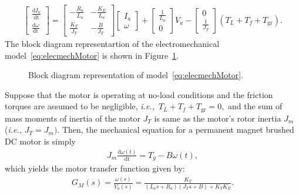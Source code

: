 %
  \begin{align}
    \label{eq:elecmechMotor}
  \begin{bmatrix}
    \frac{\mathrm{d}I_a}{\mathrm{dt}}\\
    \frac{\mathrm{d}\omega}{\mathrm{dt}}
  \end{bmatrix}
  = 
  \begin{bmatrix}
    -\frac{R_a}{L_a}  & -\frac{K_E}{L_a}\\
    \frac{K_T}{J_T}  & -\frac{B}{J_T}
  \end{bmatrix}
  \begin{bmatrix}
    I_a\\
    \omega
  \end{bmatrix}
+
  \begin{bmatrix}
    \frac{1}{L_a}\\
    0
  \end{bmatrix}
  V_a
-
  \begin{bmatrix}
    0\\
    \frac{1}{J_T}
  \end{bmatrix}
(T_L+T_f+T_{\mathrm{gr}}).
\end{align}
%
The block diagram representartion of the electromechanical model~\eqref{eq:elecmechMotor} is shown in Figure~\ref{fig:dcMotorElecMech}. %
%
\begin{figure}
  \centering
\caption{Block diagram representation of model~\eqref{eq:elecmechMotor}.}
\label{fig:dcMotorElecMech}
\end{figure}
%
Suppose that the motor is operating at no-load conditions and the friction torques are assumed to be negligible, \textit{i.e.,~}$T_L + T_f +T_{\mathrm{gr}} = 0,$ and the sum of mass moments of inertia of the motor $J_T$ is same as the motor's rotor inertia $J_m$ (\textit{i.e.,} $J_T=J_m).$ Then, the mechanical equation for  a permanent magnet brushed DC motor is simply
%
  \begin{align}
    \label{eq:motorMechanical}
    J_m\frac{\mathrm{d}\omega(t)}{\mathrm{dt}} = T_g - B\omega(t),
\end{align}  
%
which yields the motor transfer function given by: %
%
\begin{align}
  \label{eq:GM}
    G_M(s) = \frac{\omega(s)}{V_a(s)} = \frac{K_T}{\left(L_as + R_a\right)\left(J_Ts + B\right) + K_TK_E}.
\end{align}
